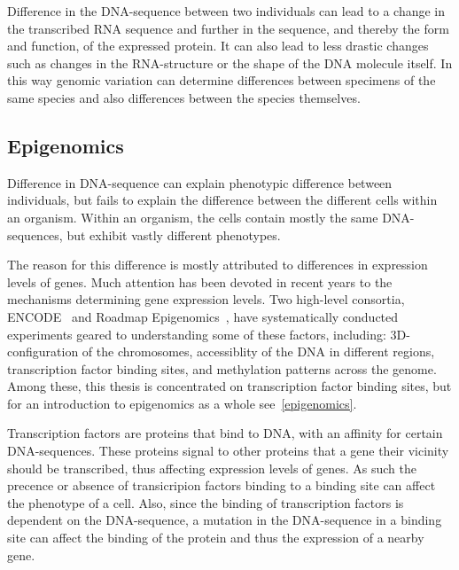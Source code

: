 Difference in the DNA-sequence between two individuals can lead to a change in the transcribed RNA sequence and further in the sequence, and thereby the form and function, of the expressed protein.
It can also lead to less drastic changes such as changes in the RNA-structure or the shape of the DNA molecule itself.
In this way genomic variation can determine differences between specimens of the same species and also differences between the species themselves.

\subsection{Epigenomics}
Difference in DNA-sequence can explain phenotypic  difference between individuals, but fails to explain the difference between the different cells within an organism.
Within an organism, the cells contain mostly the same DNA-sequences, but exhibit vastly different phenotypes. 

The reason for this difference is mostly attributed to differences in expression levels of genes.
Much attention has been devoted in recent years to the mechanisms determining gene expression levels.
Two high-level consortia, ENCODE~\cite{encode} and Roadmap Epigenomics~\cite{roadmap}, have systematically conducted experiments geared to understanding some of these factors, including: 3D-configuration of the chromosomes, accessiblity of the DNA in different regions, transcription factor binding sites, and methylation patterns across the genome.
Among these, this thesis is concentrated on transcription factor binding sites, but for an introduction to epigenomics as a whole see~\ref{epigenomics}.

Transcription factors are proteins that bind to DNA, with an affinity for certain DNA-sequences.
These proteins signal to other proteins that a gene their vicinity should be transcribed, thus affecting expression levels of genes.
As such the precence or absence of transicripion factors binding to a binding site can affect the phenotype of a cell.
Also, since the binding of transcription factors is dependent on the DNA-sequence, a mutation in the DNA-sequence in a binding site can affect the binding of the protein and thus the expression of a nearby gene. 

